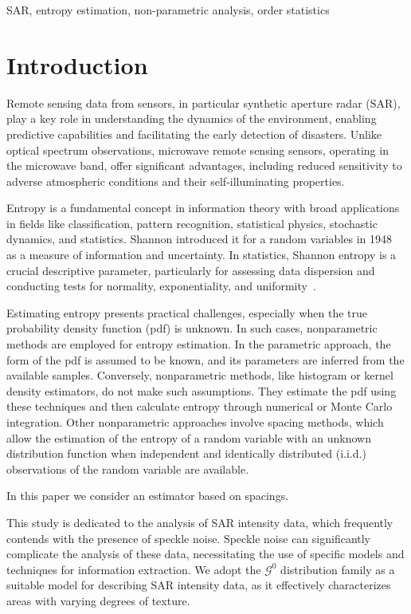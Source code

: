 \documentclass[conference]{IEEEtran}
\begin{document}
\begin{IEEEkeywords}
SAR, entropy estimation, non-parametric analysis, order statistics
\end{IEEEkeywords}

\section{Introduction}\label{sec_01}

Remote sensing data from sensors, in particular synthetic aperture radar (SAR), play a key role in understanding the dynamics of the environment, enabling predictive capabilities and facilitating the early detection of disasters. Unlike optical spectrum observations, microwave remote sensing sensors, operating in the microwave band, offer significant advantages, including reduced sensitivity to adverse atmospheric conditions and their self-illuminating properties.

Entropy is a fundamental concept in information theory with broad applications in fields like classification, pattern recognition, statistical physics, stochastic dynamics, and statistics.
Shannon introduced it for a random variables in 1948~\cite{Shannon1948} as a measure of information and uncertainty. 
In statistics, Shannon entropy is a crucial descriptive parameter, particularly for assessing data dispersion and conducting tests for normality, exponentiality, and uniformity~\cite{Wieczorkowski1999}.

Estimating entropy presents practical challenges, especially when the true probability density function (pdf) is unknown.
In such cases, nonparametric methods are employed for entropy estimation. 
In the parametric approach, the form of the pdf is assumed to be known, and its parameters are inferred from the available samples. 
Conversely, nonparametric methods, like histogram or kernel density estimators, do not make such assumptions. 
They estimate the pdf using these techniques and then calculate entropy through numerical or Monte Carlo integration. 
Other nonparametric approaches involve spacing methods, which allow the estimation of the entropy of a random variable with an unknown distribution function when independent and identically distributed (i.i.d.) observations of the random variable are available.

In this paper we consider an estimator based on spacings.

This study is dedicated to the analysis of SAR intensity data, which frequently contends with the presence of speckle noise. 
Speckle noise can significantly complicate the analysis of these data, necessitating the use of specific models and techniques for information extraction. 
We adopt the $\mathcal G^0$ distribution family as a suitable model for describing SAR intensity data, as it effectively characterizes areas with varying degrees of texture.
\end{document}
